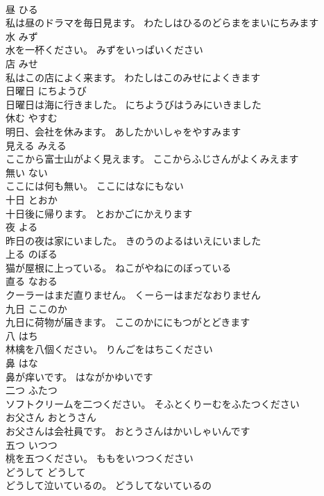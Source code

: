 \documentclass[8pt]{extreport}
\begin{document}
\begin{CJK}{UTF8}{min}
\\	昼	ひる	
\\	私は昼のドラマを毎日見ます。	わたしはひるのどらまをまいにちみます	
\\	水	みず	
\\	水を一杯ください。	みずをいっぱいください	
\\	店	みせ	
\\	私はこの店によく来ます。	わたしはこのみせによくきます	
\\	日曜日	にちようび	
\\	日曜日は海に行きました。	にちようびはうみにいきました	
\\	休む	やすむ	
\\	明日、会社を休みます。	あしたかいしゃをやすみます	
\\	見える	みえる	
\\	ここから富士山がよく見えます。	ここからふじさんがよくみえます	
\\	無い	ない	
\\	ここには何も無い。	ここにはなにもない	
\\	十日	とおか	
\\	十日後に帰ります。	とおかごにかえります	
\\	夜	よる	
\\	昨日の夜は家にいました。	きのうのよるはいえにいました	
\\	上る	のぼる	
\\	猫が屋根に上っている。	ねこがやねにのぼっている	
\\	直る	なおる	
\\	クーラーはまだ直りません。	くーらーはまだなおりません	
\\	九日	ここのか	
\\	九日に荷物が届きます。	ここのかににもつがとどきます	
\\	八	はち	
\\	林檎を八個ください。	りんごをはちこください	
\\	鼻	はな	
\\	鼻が痒いです。	はながかゆいです	
\\	二つ	ふたつ	
\\	ソフトクリームを二つください。	そふとくりーむをふたつください	
\\	お父さん	おとうさん	
\\	お父さんは会社員です。	おとうさんはかいしゃいんです	
\\	五つ	いつつ	
\\	桃を五つください。	ももをいつつください	
\\	どうして	どうして	
\\	どうして泣いているの。	どうしてないているの	

\end{CJK}
\end{document}

